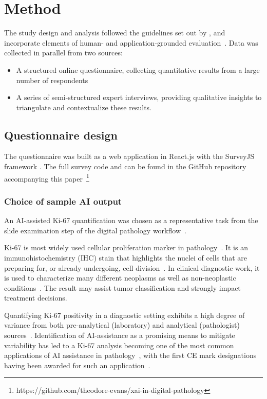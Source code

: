 \section{Method}
\label{sec:method}

The study design and analysis followed the guidelines set out by \citet{runeson_guidelines_2008}, and incorporate elements of human- and application-grounded evaluation~\cite{doshi2017towards}. Data was collected in parallel from two sources:

\begin{itemize}
    \item A structured online questionnaire, collecting quantitative results from a large number of respondents
    \item A series of semi-structured expert interviews, providing qualitative insights to triangulate and contextualize these results. 
\end{itemize}

\subsection{Questionnaire design}

The questionnaire was built as a web application in React.js with the SurveyJS framework \cite{devsoft-baltic-ou-2021}. The full survey code and can be found in the GitHub repository accompanying this paper~\footnote{https://github.com/theodore-evans/xai-in-digital-pathology}

\subsubsection{Choice of sample AI output}

An AI-assisted Ki-67 quantification was chosen as a representative task from the slide examination step of the digital pathology workflow~\cite{Kargl-et-al:2020:PathoWorkflows}.

Ki-67 is most widely used cellular proliferation marker in pathology~\cite{li2015ki67}. It is an immunohistochemistry (IHC) stain that highlights the nuclei of cells that are preparing for, or already undergoing, cell division~\cite{scholzen2000ki}. In clinical diagnostic work, it is used to characterize many different neoplasms as well as non-neoplastic conditions~\cite{nadler2013ki}. The result may assist tumor classification and strongly impact treatment decisions. 

Quantifying Ki-67 positivity in a diagnostic setting exhibits a high degree of variance from both pre-analytical (laboratory) and analytical (pathologist) sources~\cite{polley2015international, rimm2019international}. Identification of AI-assistance as a promising means to mitigate variability has led to a Ki-67 analysis becoming one of the most common applications of AI assistance in pathology~\cite{geread2021pinet, lakshmi2020deep, govind2020improving}, with the first CE mark designations having been awarded for such an application~\cite{business-wire-2021}.  

